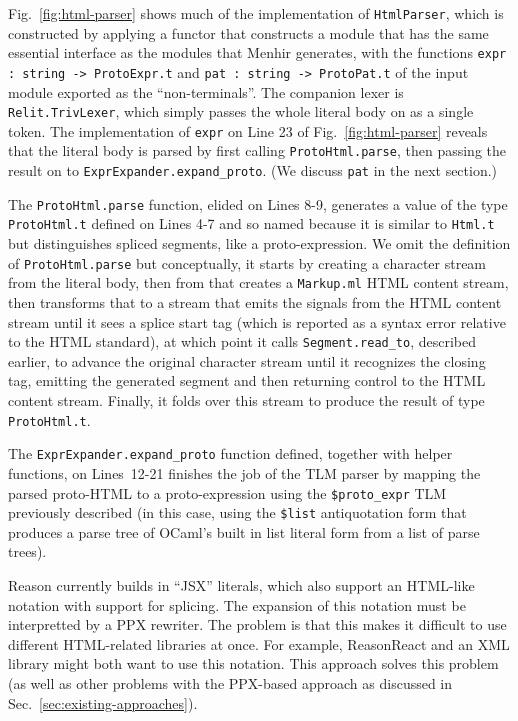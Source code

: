 \documentclass[acmsmall]{acmart}
\newcommand{\li}[1]{\lstinline[basicstyle=\ttfamily\fontsize{9pt}{1em}\selectfont]{#1}}
\begin{document}
Fig.~\ref{fig:html-parser} shows much of the implementation of \li{HtmlParser},  which is constructed by applying a functor that constructs a module that has the same essential interface as the modules that Menhir generates, with the functions \li{expr : string -> ProtoExpr.t} and \li{pat : string -> ProtoPat.t} of the input module exported as the ``non-terminals''. The companion lexer is \li{Relit.TrivLexer}, which simply passes the whole literal body on as a single token. The implementation of \li{expr} on Line 23 of Fig.~\ref{fig:html-parser} reveals that the literal body is parsed by first calling \li{ProtoHtml.parse}, then passing the result on to \li{ExprExpander.expand_proto}. (We discuss \li{pat} in the next section.)

The \li{ProtoHtml.parse} function, elided on Lines 8-9, generates a value of the type \li{ProtoHtml.t} defined on Lines 4-7 and so named because it is similar to \li{Html.t} but distinguishes spliced segments, like a proto-expression. We omit the definition of \li{ProtoHtml.parse} but conceptually, it starts by creating a character stream from the literal body, then from that creates a \li{Markup.ml} HTML content stream, then transforms that to a stream that emits the signals from the HTML content stream until it sees a splice start tag (which is reported as a syntax error relative to the HTML standard), at which point it calls \li{Segment.read_to}, described earlier, to advance the original character stream until it recognizes the closing tag, emitting the generated segment and then returning control to the HTML content stream. Finally, it folds over this stream to produce the result of type \li{ProtoHtml.t}. 

The \li{ExprExpander.expand_proto} function defined, together with helper functions, on Lines~12-21 finishes the job of the TLM parser by mapping the parsed proto-HTML to a proto-expression using the \li{$proto_expr} TLM previously described (in this case, using the \li{$list} antiquotation form that produces a parse tree of OCaml's built in list literal form from a list of parse trees).%

Reason currently builds in ``JSX'' literals, which also support an HTML-like notation with support for splicing. The expansion of this notation must be interpretted by a PPX rewriter. The problem is that this makes it difficult to use different HTML-related libraries at once. For example, ReasonReact and an XML library might both want to use this notation. This approach solves this problem (as well as other problems with the PPX-based approach as discussed in Sec.~\ref{sec:existing-approaches}).
\end{document}

